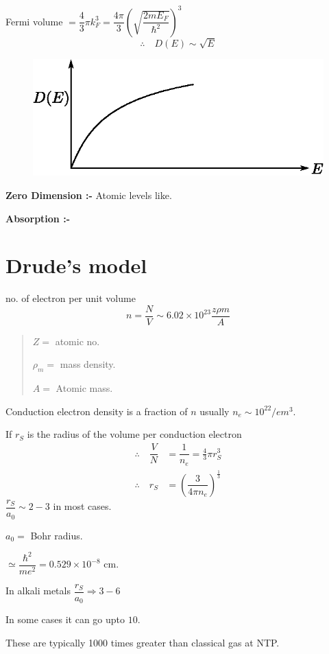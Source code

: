 Fermi volume $=\dfrac{4}{3}\pi k^{3}_F{}=\dfrac{4\pi}{3}\left(\sqrt{\dfrac{2mE_{F}}{\hbar^{2}}}\right)^{3}$
$$
\therefore\quad D(E)\sim \sqrt{E}
$$
\begin{figure}[H]
\centering
\includegraphics[scale=.8]{images/lecture25/fig5.eps}
\end{figure}

\noindent
{\bf Zero Dimension :- } Atomic levels like.

\noindent
{\bf Absorption :-}

\section*{Drude's model}

no. of electron per unit volume
$$
n=\dfrac{N}{V}\sim 6.02\times 10^{23}\dfrac{z\rho m}{A}
$$
\begin{quote}
$Z=$ atomic no.

$\rho_{m}=$ mass density.

$A=$ Atomic mass.
\end{quote}

Conduction electron density is a fraction of $n$ usually $n_{e}\sim 10^{22}/em^{3}$.

If $r_{S}$ is the radius of the volume per conduction electron
\begin{align*}
\therefore\quad \dfrac{V}{N} &=\dfrac{1}{n_{e}}=\frac{4}{3}\pi r^{3}_{S}\\
\therefore\quad r_{S} &= \left(\dfrac{3}{4\pi n_{e}}\right)^{\frac{1}{3}}
\end{align*}
$\dfrac{r_{S}}{a_{0}}\sim 2-3$ in most cases.

$a_{0}=$ Bohr radius.

$\simeq \dfrac{\hbar^{2}}{me^{2}}=0.529\times 10^{-8}$ cm.

In alkali metals $\dfrac{r_{S}}{a_{0}}\Rightarrow 3-6$

In some cases it can go upto $10$.

These are typically 1000 times greater than classical gas at NTP.

